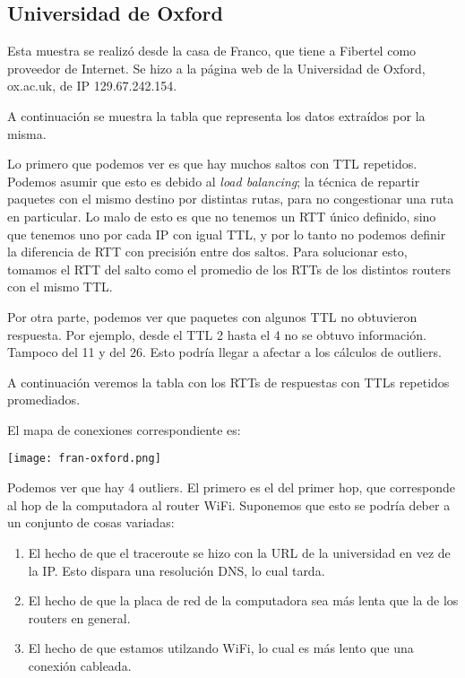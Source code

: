 \subsection{Universidad de Oxford}
Esta muestra se realizó desde la casa de Franco, que tiene a Fibertel 
como proveedor de Internet. Se hizo a la página web de la Universidad de Oxford,
ox.ac.uk, de IP 129.67.242.154. 

A continuación se muestra la tabla que representa los datos extraídos por la
misma.



Lo primero que podemos ver es que hay muchos saltos con TTL repetidos. Podemos
asumir que esto es debido al \emph{load balancing}; la técnica de repartir
paquetes con el mismo destino por distintas rutas, para no congestionar una
ruta en particular. Lo malo de esto es que no tenemos un RTT único definido,
sino que tenemos uno por cada IP con igual TTL, y por lo tanto no podemos
definir la diferencia de RTT con precisión entre dos saltos.
Para solucionar esto, tomamos el RTT del salto como el promedio de los RTTs
de los distintos routers con el mismo TTL.

Por otra parte, podemos ver que paquetes con algunos TTL no obtuvieron
respuesta. Por ejemplo, desde el TTL 2 hasta el 4 no se obtuvo información. 
Tampoco del 11 y del 26. Esto podría llegar a afectar a los cálculos de outliers.

A continuación veremos la tabla con los RTTs de respuestas con TTLs repetidos
promediados.



El mapa de conexiones correspondiente es:

\begin{center}
    \texttt{[image: fran-oxford.png]}
\end{center}
    

Podemos ver que hay 4 outliers. El primero es el del primer hop, que corresponde
al hop de la computadora al router WiFi. Suponemos que esto se podría deber a
un conjunto de cosas variadas:
\begin{enumerate}
\item El hecho de que el traceroute se hizo con la URL de la universidad en vez de 
la IP. Esto dispara una resolución DNS, lo cual tarda.
\item El hecho de que la placa de red de la computadora sea más lenta
que la de los routers en general.
\item El hecho de que estamos utilzando WiFi, lo cual es más lento que una conexión
cableada.
\end{enumerate}

